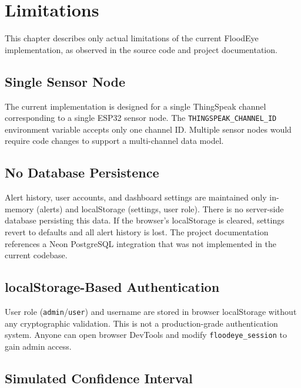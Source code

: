 ﻿%
\chapter{Limitations}

This chapter describes only actual limitations of the current FloodEye implementation, as observed in the source code and project documentation.

\section{Single Sensor Node}

The current implementation is designed for a single ThingSpeak channel corresponding to a single ESP32 sensor node. The \texttt{THINGSPEAK\_\allowbreak{}CHANNEL\_\allowbreak{}ID} environment variable accepts only one channel ID. Multiple sensor nodes would require code changes to support a multi-channel data model.

\section{No Database Persistence}

Alert history, user accounts, and dashboard settings are maintained only in-memory (alerts) and localStorage (settings, user role). There is no server-side database persisting this data. If the browser's localStorage is cleared, settings revert to defaults and all alert history is lost. The project documentation references a Neon PostgreSQL integration that was not implemented in the current codebase.

\section{localStorage-Based Authentication}

User role (\texttt{admin}/\texttt{user}) and username are stored in browser localStorage without any cryptographic validation. This is not a production-grade authentication system. Anyone can open browser DevTools and modify \texttt{floodeye\_\allowbreak{}session} to gain admin access.

\section{Simulated Confidence Interval}

